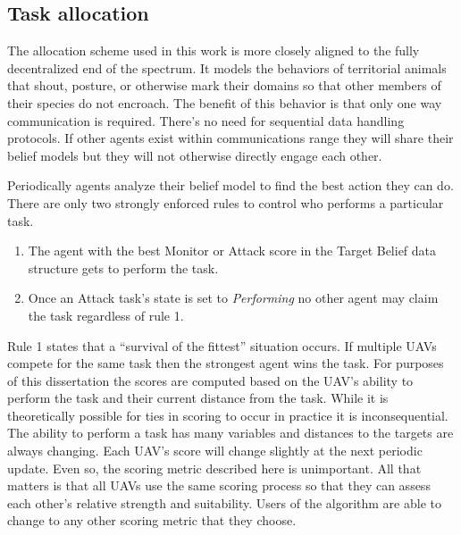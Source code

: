 
\subsection{Task allocation}
\label{sec:uncoordTaskingMyWork}


The allocation scheme used in this work is more closely aligned to the fully decentralized end of the spectrum.  It models the behaviors of territorial animals that shout, posture, or otherwise mark their domains so that other members of their species do not encroach.  The benefit of this behavior is that only one way communication is required.  There's no need for sequential data handling protocols.  If other agents exist within communications range they will share their belief models but they will not otherwise directly engage each other.  

Periodically agents analyze their belief model to find the best action they can do.  There are only two strongly enforced rules to control who performs a particular task.  

\begin{enumerate}
	\item The agent with the best Monitor or Attack score in the Target Belief data structure gets to perform the task.
	\item Once an Attack task's state is set to \textit{Performing} no other agent may claim the task regardless of rule 1.
\end{enumerate}

Rule 1 states that a ``survival of the fittest'' situation occurs.  If multiple UAVs compete for the same task then the strongest agent wins the task.  For purposes of this dissertation the scores are computed based on the UAV's ability to perform the task and their current distance from the task.  While it is theoretically possible for ties in scoring to occur in practice it is inconsequential.  The ability to perform a task has many variables and distances to the targets are always changing.  Each UAV's score will change slightly at the next periodic update.  Even so, the scoring metric described here is unimportant.  All that matters is that all UAVs use the same scoring process so that they can assess each other's relative strength and suitability.  Users of the algorithm are able to change to any other scoring metric that they choose.

